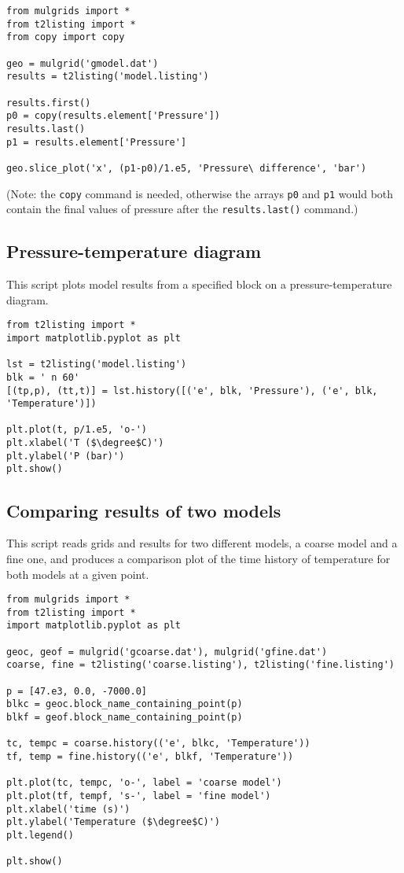 \begin{lstlisting}
from mulgrids import *
from t2listing import *
from copy import copy

geo = mulgrid('gmodel.dat')
results = t2listing('model.listing')

results.first()
p0 = copy(results.element['Pressure'])
results.last()
p1 = results.element['Pressure']

geo.slice_plot('x', (p1-p0)/1.e5, 'Pressure\ difference', 'bar')
\end{lstlisting}

(Note: the \texttt{copy} command is needed, otherwise the arrays \texttt{p0} and \texttt{p1} would both contain the final values of pressure after the \texttt{results.last()} command.)

\subsection{Pressure-temperature diagram}

This script plots model results from a specified block on a pressure-temperature diagram.

\begin{lstlisting}
from t2listing import *
import matplotlib.pyplot as plt

lst = t2listing('model.listing')
blk = ' n 60'
[(tp,p), (tt,t)] = lst.history([('e', blk, 'Pressure'), ('e', blk, 'Temperature')])

plt.plot(t, p/1.e5, 'o-')
plt.xlabel('T ($\degree$C)')
plt.ylabel('P (bar)')
plt.show()
\end{lstlisting}

\subsection{Comparing results of two models}
\label{comparison_example}

This script reads grids and results for two different models, a coarse model and a fine one, and produces a comparison plot of the time history of temperature for both models at a given point.

\begin{lstlisting}
from mulgrids import *
from t2listing import *
import matplotlib.pyplot as plt

geoc, geof = mulgrid('gcoarse.dat'), mulgrid('gfine.dat')
coarse, fine = t2listing('coarse.listing'), t2listing('fine.listing')

p = [47.e3, 0.0, -7000.0]
blkc = geoc.block_name_containing_point(p)
blkf = geof.block_name_containing_point(p)

tc, tempc = coarse.history(('e', blkc, 'Temperature'))
tf, temp = fine.history(('e', blkf, 'Temperature'))

plt.plot(tc, tempc, 'o-', label = 'coarse model')
plt.plot(tf, tempf, 's-', label = 'fine model')
plt.xlabel('time (s)')
plt.ylabel('Temperature ($\degree$C)')
plt.legend()

plt.show()
\end{lstlisting}

